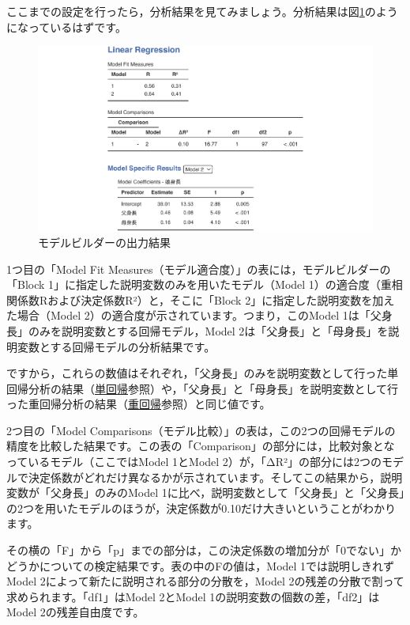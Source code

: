 \documentclass[
  12pt,
  a5jpaper,
  lualatex, ja=standard]{bxjsbook}
\begin{document}
ここまでの設定を行ったら，分析結果を見てみましょう。分析結果は図\ref{fig:regression-lr-model-builder-results}のようになっているはずです。

\begin{figure}[!ht]

{\centering \includegraphics[width=1\linewidth]{images/regression/lr-model-builder-results} 

}

\caption{モデルビルダーの出力結果}\label{fig:regression-lr-model-builder-results}
\end{figure}

1つ目の「Model Fit Measures（モデル適合度）」の表には，モデルビルダーの「Block 1」に指定した説明変数のみを用いたモデル（Model 1）の適合度（重相関係数Rおよび決定係数R²）と，そこに「Block 2」に指定した説明変数を加えた場合（Model 2）の適合度が示されています。つまり，このModel 1は「父身長」のみを説明変数とする回帰モデル，Model 2は「父身長」と「母身長」を説明変数とする回帰モデルの分析結果です。

ですから，これらの数値はそれぞれ，「父身長」のみを説明変数として行った単回帰分析の結果（\protect\hyperlink{lr-uni}{単回帰}参照）や，「父身長」と「母身長」を説明変数として行った重回帰分析の結果（\protect\hyperlink{lr-multi}{重回帰}参照）と同じ値です。

2つ目の「Model Comparisons（モデル比較）」の表は，この2つの回帰モデルの精度を比較した結果です。この表の「Comparison」の部分には，比較対象となっているモデル（ここではModel 1とModel 2）が，「ΔR²」の部分には2つのモデルで決定係数がどれだけ異なるかが示されています。そしてこの結果から，説明変数が「父身長」のみのModel 1に比べ，説明変数として「父身長」と「父身長」の2つを用いたモデルのほうが，決定係数が0.10だけ大きいということがわかります。

その横の「F」から「p」までの部分は，この決定係数の増加分が「0でない」かどうかについての検定結果です。表の中のFの値は，Model 1では説明しきれずModel 2によって新たに説明される部分の分散を，Model 2の残差の分散で割って求められます。「df1」はModel 2とModel 1の説明変数の個数の差，「df2」はModel 2の残差自由度です。
\end{document}
